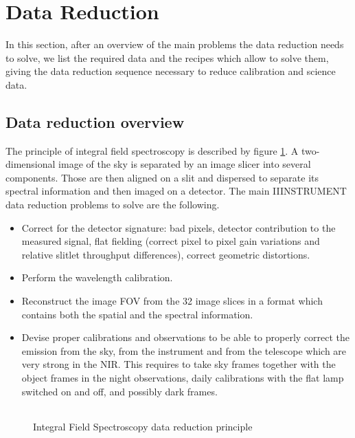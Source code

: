 \section{\label{data_reduction}Data Reduction}

In this section, after an overview of the main problems the data reduction 
needs to solve, we list the required data and the recipes which allow to 
solve them, giving the data reduction sequence necessary to reduce calibration 
and science data. 

\subsection{Data reduction overview}
The principle of integral field spectroscopy is described by 
figure \ref{ifs_principle}. A two-dimensional image of the sky is 
separated by an image slicer into several components. Those are then  
aligned on a slit and dispersed to separate its spectral information
and then imaged on a detector. 
The main IIINSTRUMENT data reduction problems to solve are the following.

\begin{itemize}
\item Correct for the detector signature: bad pixels, detector contribution 
to the measured signal, flat fielding (correct pixel to pixel gain variations 
and relative slitlet throughput differences), correct geometric distortions.
\item Perform the wavelength calibration.
\item Reconstruct the image FOV from the 32 image slices in a format which 
contains both the spatial and the spectral information.
\item Devise proper calibrations and observations to be able to properly 
correct the emission from the sky, from the instrument and from the telescope 
which are very strong in the NIR.
This requires to take sky frames together with the object frames in the night 
observations, daily calibrations with the flat lamp switched on and off, and 
possibly dark frames.

\end{itemize}
\begin{figure}[ht]
\begin{center}
\begin{tabular}{c}
\end{tabular}
\end{center}
\caption{\label{ifs_principle}Integral Field Spectroscopy data reduction 
principle}
\end{figure}

